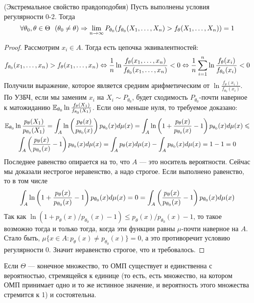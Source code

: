 \begin{theorem} (Экстремальное свойство правдоподобия)
	Пусть выполнены условия регулярности 0-2. Тогда
	\[
		\forall \theta_0, \theta \in \Theta\ \ (\theta_0 \neq \theta) \Rightarrow \lim_{n \to \infty} P_{\theta_0}(f_{\theta_0}(X_1, \ldots, X_n) > f_\theta(X_1, \ldots, X_n)) = 1
	\]
\end{theorem}

\begin{proof}
	Рассмотрим $x_i \in A$. Тогда есть цепочка эквивалентностей:
	\[
		f_{\theta_0}(x_1, \ldots, x_n) > f_\theta(x_1, \ldots, x_n) \Leftrightarrow \frac{1}{n}\ln\frac{f_\theta(x_1, \ldots, x_n)}{f_{\theta_0}(x_1, \ldots, x_n)} < 0 \Leftrightarrow \frac{1}{n}\sum_{i = 1}^n \ln\frac{f_\theta(x_i)}{f_{\theta_0}(x_i)} < 0
	\]
	Получили выражение, которое является средним арифметическим от $\ln\frac{f_\theta(x_i)}{f_{\theta_0}(x_i)}$. По УЗБЧ, если мы заменим $x_i$ на $X_i \sim P_{\theta_0}$, будет сходимость $P_{\theta_0}$-почти наверное к матожиданию $\mathbb{E}_{\theta_0} \ln\frac{f_\theta(X_1)}{f_{\theta_0}(X_1)}$. Если оно меньше нуля, то требуемое доказано:
	\begin{multline*}
		\mathbb{E}_{\theta_0} \ln\frac{p_\theta(X_1)}{p_{\theta_0}(X_1)} = \int_A \ln\left(\frac{p_\theta(x)}{p_{\theta_0}(x)}\right)p_{\theta_0}(x)d\mu(x) = \int_A \ln\left(1 + \frac{p_\theta(x)}{p_{\theta_0}(x)} - 1\right)p_{\theta_0}(x)d\mu(x) \leqslant
		\\
		\int_A \left(\frac{p_\theta(x)}{p_{\theta_0}(x)} - 1\right)p_{\theta_0}(x)d\mu(x) = \int_A p_\theta(x)d\mu(x) - \int_A p_{\theta_0}(x)d\mu(x) = 1 - 1 = 0
	\end{multline*}
	Последнее равенство опирается на то, что $A$ --- это носитель вероятности. Сейчас мы доказали нестрогое неравенство, а надо строгое. Если выполнено равенство, то в том числе
	\[
		\int_A \ln\left(1 + \frac{p_\theta(x)}{p_{\theta_0}(x)} - 1\right)p_{\theta_0}(x)d\mu(x) = 0 = \int_A \left(\frac{p_\theta(x)}{p_{\theta_0}(x)} - 1\right)p_{\theta_0}(x)d\mu(x)
	\]
	Так как $\ln(1 + p_\theta(x) / p_{\theta_0}(x) - 1) \le p_\theta(x) / p_{\theta_0}(x) - 1$, то такое возможно тогда и только тогда, когда эти функции равны $\mu$-почти наверное на $A$. Стало быть, $\mu\{x \in A \colon p_\theta(x) \neq p_{\theta_0}(x)\} = 0$, а это противоречит условию регулярности 0. Значит неравенство строгое, что и требовалось.
\end{proof}

\begin{corollary}
	Если $\Theta$ --- конечное множество, то ОМП существует и единственна с вероятностью, стремящейся к единице (то есть, есть множество, на котором ОМП принимает одно и то же истинное значение, и вероятность этого множества стремится к 1) и состоятельна.
\end{corollary}


